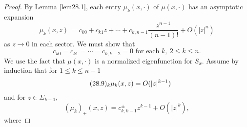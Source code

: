 \documentclass{surv-l}
\theoremstyle{plain}
\theoremstyle{definition}
\numberwithin{equation}{chapter}
\begin{document}
\begin{proof} By Lemma \ref{lem28.1}, each entry $\mu_{k}(x,\cdot)$ of $\mu(x,\cdot)$ has an asymptotic expansion
\begin{equation}\label{eq28.7}
\mu_{k}(x, z)\ =c_{k0}+c_{k1}z+\cdots +c_{k,n-1}\frac{z^{n-1}}{(n-1)!}+O(|z|^{n})
\end{equation}
as $z\rightarrow 0$ in each sector. We must show that
\begin{equation}\label{eq28.8}
c_{k0}=c_{k1}=\cdots =c_{k,k-2}=0\text{ for each } k,\ 2\leq k\leq n.
\end{equation}
We use the fact that $\mu(x, \cdot)$ is a normalized eigenfunction for $S_{x}$. Assume by induction that for $1\leq
k\leq n-1$
\begin{align*}\tag*{$(28.9)_{k}$}
&\mu_{k}(x, z)=O(|z|^{k-1})
\end{align*}
and for $z\in\Sigma_{k-1}$,
\begin{equation*}
(\mu_{k})_{\pm}(x,z)=c_{k,k-1}^{\pm}z^{k-1}+O(|z|^{k}),
\end{equation*}
where


\end{proof}
\end{document}

